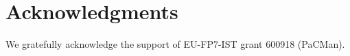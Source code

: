\section{Acknowledgments}\label{sec:Acknowledgments}

We gratefully acknowledge the support of EU-FP7-IST grant 600918 (PaCMan).
 